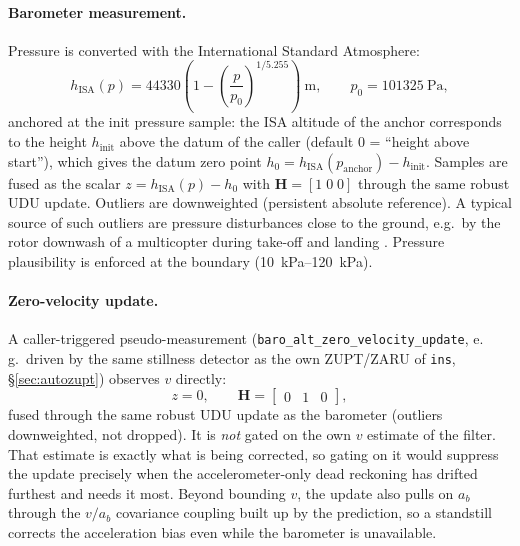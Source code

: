 \documentclass[11pt,a4paper]{article}
\newcommand{\mat}[1]{\bm{#1}}
\newcommand{\code}[1]{\texttt{#1}}
\begin{document}
\paragraph{Barometer measurement.} Pressure is converted with the
International Standard Atmosphere:
\begin{equation}
  h_{\text{ISA}}(p) = 44330 \left( 1 -
    \left(\frac{p}{p_0}\right)^{1/5.255} \right)\ \si{\metre},
  \qquad p_0 = \SI{101325}{\pascal},
  \label{eq:isa}
\end{equation}
anchored at the init pressure sample: the ISA altitude of the anchor
corresponds to the height $h_{\text{init}}$ above the datum of the caller
(default 0 = ``height above start''), which gives the datum zero point
$h_0 = h_{\text{ISA}}(p_{\text{anchor}}) - h_{\text{init}}$. Samples are
fused as the scalar $z = h_{\text{ISA}}(p) - h_0$ with
$\mat{H} = [1\;0\;0]$ through the same robust UDU update.
Outliers are downweighted (persistent absolute reference). A typical source
of such outliers are pressure disturbances close to the ground, e.g.\ by the
rotor downwash of a multicopter during take-off and landing \cite{zwiener2019}.
Pressure plausibility is enforced at the boundary (\SIrange{10}{120}{\kilo\pascal}).

\paragraph{Zero-velocity update.} A caller-triggered pseudo-measurement
(\code{baro\_\allowbreak{}alt\_\allowbreak{}zero\_\allowbreak{}velocity\_\allowbreak{}update}, e.\,g.\ driven by the same
stillness detector as the own ZUPT/ZARU of \code{ins}, \S\ref{sec:autozupt})
observes $v$ directly:
\begin{equation}
  z = 0, \qquad \mat{H} = \begin{bmatrix} 0 & 1 & 0 \end{bmatrix},
\end{equation}
fused through the same robust UDU update as the barometer (outliers
downweighted, not dropped). It is \emph{not} gated on the own $v$ estimate of the
filter. That estimate is exactly what is being corrected, so gating on it would
suppress the update precisely when the accelerometer-only dead reckoning has
drifted furthest and needs it most. Beyond bounding $v$, the update also pulls
on $a_b$ through the $v/a_b$ covariance coupling built up by the prediction, so
a standstill corrects the acceleration bias even while the barometer is
unavailable.
\end{document}
